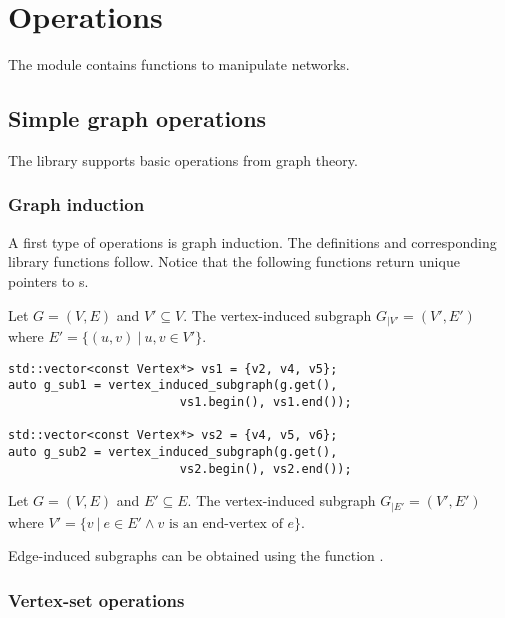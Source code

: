 \chapter{Operations} \label{ch:operations}

The  module contains functions to manipulate networks.
    
\section{Simple graph operations}

The library supports basic operations from graph theory.

\subsection{Graph induction}

A first type of operations is graph induction. The definitions and corresponding library functions follow. Notice that the following functions return unique pointers to s.

\begin{definition}
Let $G = (V, E)$ and $V' \subseteq V$. The vertex-induced subgraph $G_{|V'} = (V', E')$ where $ E' = \{ (u,v) \ | \ u, v  \in V' \}$.
\end{definition}

\begin{lstlisting}[style=c++]
std::vector<const Vertex*> vs1 = {v2, v4, v5};
auto g_sub1 = vertex_induced_subgraph(g.get(), 
                        vs1.begin(), vs1.end());
    
std::vector<const Vertex*> vs2 = {v4, v5, v6};
auto g_sub2 = vertex_induced_subgraph(g.get(), 
                        vs2.begin(), vs2.end());
\end{lstlisting}

\begin{definition}
Let $G = (V, E)$ and $E' \subseteq E$. The vertex-induced subgraph $G_{|E'} = (V', E')$ where $ V' = \{ v \ | \ e  \in E' \land v \mbox{ is an end-vertex of } e \}$.
\end{definition}

Edge-induced subgraphs can be obtained using the function .

\subsection{Vertex-set operations}

